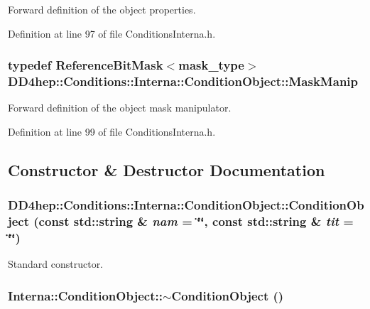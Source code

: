Forward definition of the object properties. 

Definition at line 97 of file ConditionsInterna.h.\hypertarget{class_d_d4hep_1_1_conditions_1_1_interna_1_1_condition_object_a43dfd5df006474f17b7eba59b2f511fe}{
\subsubsection[{MaskManip}]{\setlength{\rightskip}{0pt plus 5cm}typedef {\bf ReferenceBitMask}$<${\bf mask\_\-type}$>$ {\bf DD4hep::Conditions::Interna::ConditionObject::MaskManip}}}
\label{class_d_d4hep_1_1_conditions_1_1_interna_1_1_condition_object_a43dfd5df006474f17b7eba59b2f511fe}


Forward definition of the object mask manipulator. 

Definition at line 99 of file ConditionsInterna.h.

\subsection{Constructor \& Destructor Documentation}
\hypertarget{class_d_d4hep_1_1_conditions_1_1_interna_1_1_condition_object_a13a35738bc2b0cdcb5b276d628e1bef6}{
\subsubsection[{ConditionObject}]{\setlength{\rightskip}{0pt plus 5cm}DD4hep::Conditions::Interna::ConditionObject::ConditionObject (const std::string \& {\em nam} = {\ttfamily \char`\"{}\char`\"{}}, \/  const std::string \& {\em tit} = {\ttfamily \char`\"{}\char`\"{}})}}
\label{class_d_d4hep_1_1_conditions_1_1_interna_1_1_condition_object_a13a35738bc2b0cdcb5b276d628e1bef6}


Standard constructor. \hypertarget{class_d_d4hep_1_1_conditions_1_1_interna_1_1_condition_object_a37f67e8fcbbb726ba44d7f043ec5bcdf}{
\subsubsection[{$\sim$ConditionObject}]{\setlength{\rightskip}{0pt plus 5cm}Interna::ConditionObject::$\sim$ConditionObject ()}}
\label{class_d_d4hep_1_1_conditions_1_1_interna_1_1_condition_object_a37f67e8fcbbb726ba44d7f043ec5bcdf}


